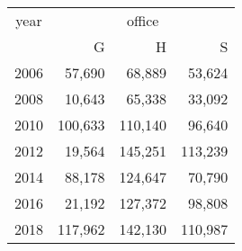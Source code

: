\footnotesize\begin{tabular}[t]{lrrr}
\toprule
\multicolumn{1}{c}{year} & \multicolumn{3}{c}{office} \\
\cmidrule(l{3pt}r{3pt}){1-1} \cmidrule(l{3pt}r{3pt}){2-4}
  & G & H & S\\
\midrule
2006 & 57,690 & 68,889 & 53,624\\
2008 & 10,643 & 65,338 & 33,092\\
2010 & 100,633 & 110,140 & 96,640\\
2012 & 19,564 & 145,251 & 113,239\\
2014 & 88,178 & 124,647 & 70,790\\
2016 & 21,192 & 127,372 & 98,808\\
2018 & 117,962 & 142,130 & 110,987\\
\bottomrule
\end{tabular}
